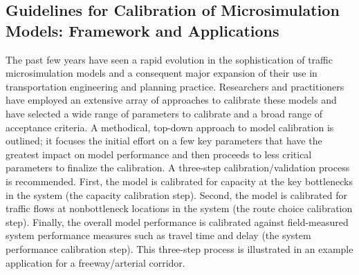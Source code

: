 \documentclass{article}
\begin{document}
\subsection*{Guidelines for Calibration of Microsimulation Models: Framework and Applications \cite{guidelinesCalib}
}
The past few years have seen a rapid evolution in the sophistication of traffic microsimulation models and a consequent major expansion of their use in transportation engineering and planning practice. Researchers and practitioners have employed an extensive array of approaches to calibrate these models and have selected a wide range of parameters to calibrate and a broad range of acceptance criteria. A methodical, top-down approach to model calibration is outlined; it focuses the initial effort on a few key parameters that have the greatest impact on model performance and then proceeds to less critical parameters to finalize the calibration. A three-step calibration/validation process is recommended. First, the model is calibrated for capacity at the key bottlenecks in the system (the capacity calibration step). Second, the model is calibrated for traffic flows at nonbottleneck locations in the system (the route choice calibration step). Finally, the overall model performance is calibrated against field-measured system performance measures such as travel time and delay (the system performance calibration step). This three-step process is illustrated in an example application for a freeway/arterial corridor.
\end{document}
